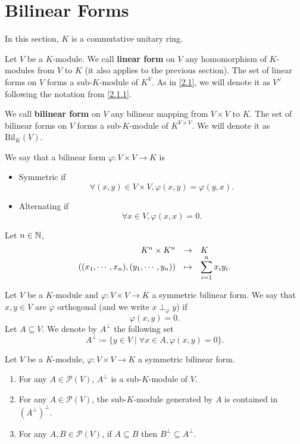 \section{Bilinear Forms}
\quad In this section, $K$ is a commutative unitary ring.
\begin{definitionenv}
    Let $V$ be a $K$-module. We call \textbf{linear form} on $V$ any homomorphism of $K$-modules from $V$ to $K$ (it also applies to the previous section).
    The set of linear forms on $V$ forms a sub-$K$-module of $K^V$. As in \ref{2.1}, we will denote it as $V^\vee$ following the notation from \ref{2.1.1}.
    
    \quad We call \textbf{bilinear form} on $V$ any bilinear mapping from $V\times V$ to $K$.
    The set of bilinear forms on $V$ forms a sub-$K$-module of $K^{V\times V}$. We will denote it as $\mathrm{Bil}_K\left(V\right)$.
    
    \quad We say that a bilinear form $\varphi: V\times V\rightarrow K$ is
    \begin{itemize}
        \item Symmetric if
        $$\forall (x,y)\in V\times V, \varphi(x,y) = \varphi(y,x).$$
        \item Alternating if
        $$ \forall x\in V, \varphi (x,x) = 0.$$
    \end{itemize}
\end{definitionenv}
\begin{exampleenv}
    Let $n\in \mathbb{N}$,
    $$ \begin{array}{rcl}
        K^n\times K^n & \rightarrow & K\\
        \left((x_1,\cdots,x_n), (y_1,\cdots,y_n)\right) & \mapsto & \displaystyle \sum_{i=1}^{n} x_i y_i.
    \end{array}$$
\end{exampleenv}
\begin{definitionenv}
    Let $V$ be a $K$-module and $\varphi: V\times V \rightarrow K$ a symmetric bilinear form. We say that $x,y \in V$ are $\varphi$ orthogonal (and we write $x \perp_\varphi y$) if
    $$ \varphi\left(x,y\right) = 0.$$
    Let $A\subseteq V$. We denote by $A^\perp$ the following set
    $$ A^\perp \coloneq \{y\in V\mid \forall x\in A, \varphi (x,y) = 0\}.$$
\end{definitionenv}
\begin{propositionenv}
    Let $V$ be a $K$-module, $\varphi:V\times V\rightarrow K$ a symmetric bilinear form.
    \begin{enumerate}
        \item For any $A\in \mathscr{P}(V)$, $A^\perp$ is a sub-$K$-module of $V$.
        \item For any $A\in \mathscr{P}(V)$, the sub-$K$-module generated by $A$ is contained in $\left(A^\perp\right)^\perp$.
        \item For any $A,B\in \mathscr{P}(V)$, if $A\subseteq B$ then $B^\perp\subseteq A^\perp$. 
    \end{enumerate}
\end{propositionenv}
